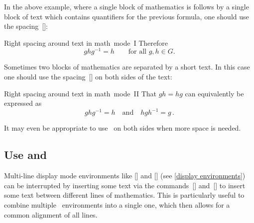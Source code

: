 In the above example, where a single block of mathematics is follows by a single block of text which contains quantifiers for the previous formula, one should use the spacing~[\comname]:
\begin{showlatex}{Right spacing around text in math~mode~I}
Therefore
\[
  g h g^{-1}
  =
  h
  \qquad
  \text{for all $g, h \in G$.}
\]
\end{showlatex}
Sometimes two blocks of mathematics are separated by a short text.
In this case one should use the spacing~[\comname] on both sides of the text:
\begin{showlatex}{Right spacing around text in math~mode~II}
That $gh = hg$ can equivalently be expressed as
\[
  g h g^{-1} = h
  \quad\text{and}\quad
  h g h^{-1} = g \,.
\]
\end{showlatex}
It may even be appropriate to use~ on both sides when more space is needed.



\subsection{Use  and }

Multi-line display mode environments like [\envname] and [\envname] (see \cref{display environments}) can be interrupted by inserting some text via the commands~[\comname] and~[\comname] to insert some text between different lines of mathematics.
This is particularly useful to combine multiple ~environments into a single one, which then allows for a common alignment of all lines.

